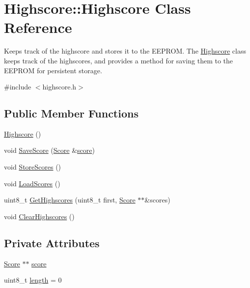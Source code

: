 \hypertarget{class_highscore_1_1_highscore}{}\section{Highscore\+:\+:Highscore Class Reference}
\label{class_highscore_1_1_highscore}


Keeps track of the highscore and stores it to the E\+E\+P\+R\+OM. The \hyperlink{class_highscore_1_1_highscore}{Highscore} class keeps track of the highscores, and provides a method for saving them to the E\+E\+P\+R\+OM for persistent storage.  




{\ttfamily \#include $<$highscore.\+h$>$}

\subsection*{Public Member Functions}
\begin{DoxyCompactItemize}
\item 
\hyperlink{class_highscore_1_1_highscore_a64076b0cd51d8045a6cac3e53e2ada79}{Highscore} ()
\item 
void \hyperlink{class_highscore_1_1_highscore_ae19e8a6c55b49d6dd874b61ef496dcea}{Save\+Score} (\hyperlink{struct_highscore_1_1_score}{Score} \&\hyperlink{class_highscore_1_1_highscore_a569a403dc24a8fa67efd7065148f4c9d}{score})
\item 
void \hyperlink{class_highscore_1_1_highscore_ad0e1b3277228a38513b5c86059ebcd6d}{Store\+Scores} ()
\item 
void \hyperlink{class_highscore_1_1_highscore_acaba923c4f4acb3c174fb5e325f1bc5e}{Load\+Scores} ()
\item 
uint8\+\_\+t \hyperlink{class_highscore_1_1_highscore_af863b0108cf33796e96efa6d0ba613a1}{Get\+Highscores} (uint8\+\_\+t first, \hyperlink{struct_highscore_1_1_score}{Score} $\ast$$\ast$\&scores)
\item 
void \hyperlink{class_highscore_1_1_highscore_ad2d0f11408e3d47c7b8434a71212f6c2}{Clear\+Highscores} ()
\end{DoxyCompactItemize}
\subsection*{Private Attributes}
\begin{DoxyCompactItemize}
\item 
\hyperlink{struct_highscore_1_1_score}{Score} $\ast$$\ast$ \hyperlink{class_highscore_1_1_highscore_a569a403dc24a8fa67efd7065148f4c9d}{score}
\item 
uint8\+\_\+t \hyperlink{class_highscore_1_1_highscore_a18a119eae9c24ab69477411b9bf45867}{length} = 0
\end{DoxyCompactItemize}


